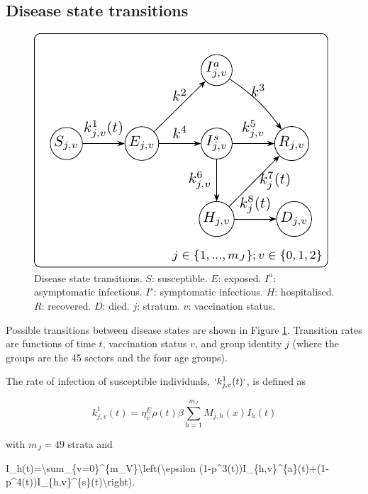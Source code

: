 \documentclass[
]{article}
\newenvironment{Shaded}{\begin{snugshade}}{\end{snugshade}}
\newcommand{\NormalTok}[1]{#1}
\begin{document}
\subsection{Disease state transitions}\label{disease-state-transitions}

\begin{figure}
\includegraphics[width=0.5\linewidth]{README_files/figure-latex/statetransitions-1} \caption{Disease state transitions. $S$: susceptible. $E$: exposed. $I^{a}$: asymptomatic infectious. $I^{s}$: symptomatic infectious. $H$: hospitalised. $R$: recovered. $D$: died. $j$: stratum. $v$: vaccination status.}\label{fig:statetransitions}
\end{figure}

Possible transitions between disease states are shown in Figure \ref{fig:statetransitions}. Transition rates are functions of time \(t\), vaccination status \(v\), and group identity \(j\) (where the groups are the 45 sectors and the four age groups).

The rate of infection of susceptible individuals, \(`k^{1}_{j,v}(t)`\), is defined as

\begin{equation}
k_{j,v}^{1}(t) = \eta_{v}^{E}\rho(t)\beta\sum_{h=1}^{m_J}M_{j,h}(x) I_h(t)
\label{eq:infection}
\end{equation}

with \(m_J=49\) strata and

\begin{Shaded}
\begin{Highlighting}[]
\NormalTok{ I\_h(t)=\textbackslash{}sum\_\{v=0\}\^{}\{m\_V\}\textbackslash{}left(\textbackslash{}epsilon (1{-}p\^{}3(t))I\_\{h,v\}\^{}\{a\}(t)+(1{-}p\^{}4(t))I\_\{h,v\}\^{}\{s\}(t)\textbackslash{}right). }
\end{Highlighting}
\end{Shaded}
\end{document}
